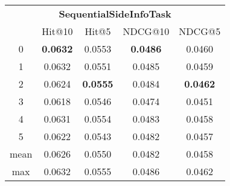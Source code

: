 \documentclass{article}
\begin{document}
 

\begin{tabular}{c|cccc}

\multicolumn{5}{c}{\textbf{SequentialSideInfoTask}} \\
\noalign{\smallskip}
\noalign{\smallskip}
\toprule
\multicolumn{1}{c}{Template ID} & \multicolumn{1}{|c}{Hit@10} & \multicolumn{1}{c}{Hit@5} & \multicolumn{1}{c}{NDCG@10} & \multicolumn{1}{c}{NDCG@5} \\
\midrule
0 & \textbf{0.0632} & 0.0553 & \textbf{0.0486} & 0.0460 \\
1 & 0.0632 & 0.0551 & 0.0485 & 0.0459 \\
2 & 0.0624 & \textbf{0.0555} & 0.0484 & \textbf{0.0462} \\
3 & 0.0618 & 0.0546 & 0.0474 & 0.0451 \\
4 & 0.0631 & 0.0554 & 0.0483 & 0.0458 \\
5 & 0.0622 & 0.0543 & 0.0482 & 0.0457 \\
\midrule
mean & 0.0626 & 0.0550 & 0.0482 & 0.0458 \\
max & 0.0632 & 0.0555 & 0.0486 & 0.0462 \\
\bottomrule

\end{tabular}
\end{document}
